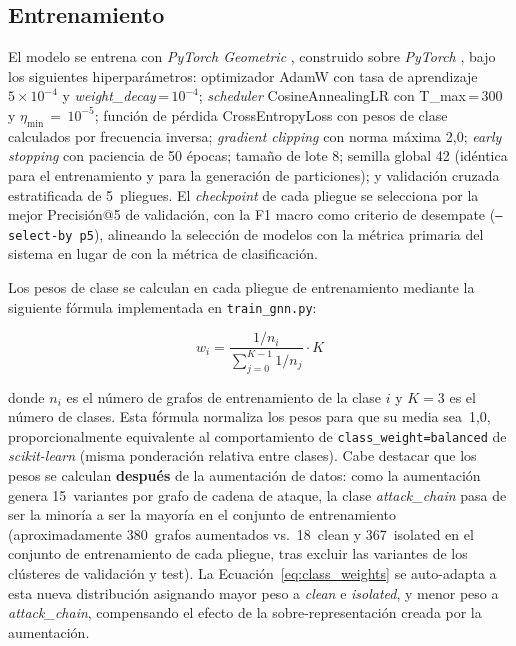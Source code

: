 \subsection{Entrenamiento}

El modelo se entrena con \textit{PyTorch Geometric} \citep{Fey2019}, construido
sobre \textit{PyTorch} \citep{Paszke2019}, bajo los siguientes hiperparámetros: optimizador AdamW con tasa de aprendizaje
\(5\times10^{-4}\) y \textit{weight\_decay}\,=\,\(10^{-4}\);
\textit{scheduler} CosineAnnealingLR con T\_max\,=\,300 y
\(\eta_{\min}\,=\,10^{-5}\); función de pérdida CrossEntropyLoss con pesos
de clase calculados por frecuencia inversa;
\textit{gradient clipping} con norma máxima 2,0; \textit{early stopping} con
paciencia de 50 épocas; tamaño de lote 8; semilla global 42 (idéntica para el
entrenamiento y para la generación de particiones); y validación cruzada
estratificada de 5~pliegues. El \textit{checkpoint} de cada pliegue se selecciona
por la mejor Precisión@5 de validación, con la F1 macro como criterio de
desempate (\texttt{--select-by p5}), alineando la selección de modelos con la
métrica primaria del sistema en lugar de con la métrica de clasificación.

Los pesos de clase se calculan en cada pliegue de entrenamiento mediante la
siguiente fórmula implementada en \texttt{train\_gnn.py}:

\begin{equation}
  w_i = \frac{1/n_i}{\displaystyle\sum_{j=0}^{K-1} 1/n_j} \cdot K
  \label{eq:class_weights}
\end{equation}

donde \(n_i\) es el número de grafos de entrenamiento de la clase \(i\) y \(K=3\)
es el número de clases. Esta fórmula normaliza los pesos para que su media sea~1,0,
proporcionalmente equivalente al comportamiento de \texttt{class\_weight=balanced} de
\textit{scikit-learn} (misma ponderación relativa entre clases). Cabe destacar que los pesos se calculan
\textbf{después} de la aumentación de datos: como la aumentación genera 15~variantes
por grafo de cadena de ataque, la clase \textit{attack\_chain} pasa de ser la
minoría a ser la mayoría en el conjunto de entrenamiento (aproximadamente 380~grafos
aumentados vs.\ 18~clean y 367~isolated en el conjunto de entrenamiento de cada
pliegue, tras excluir las variantes de los clústeres de validación y test). La Ecuación~\ref{eq:class_weights} se auto-adapta a esta nueva distribución
asignando mayor peso a \textit{clean} e \textit{isolated}, y menor peso a
\textit{attack\_chain}, compensando el efecto de la sobre-representación creada por
la aumentación.

